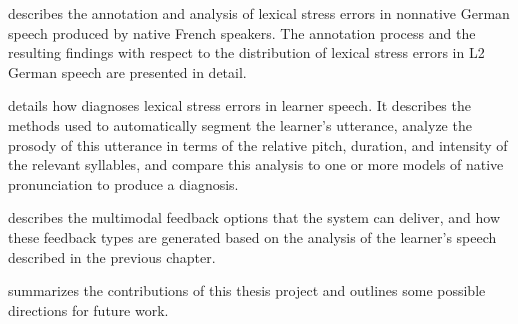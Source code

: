 describes 
the annotation and analysis of lexical stress errors in 
nonnative German speech produced by native French speakers. 
 The annotation process and the resulting findings with respect to the distribution of lexical stress errors in L2 German speech are presented in detail.

 details how  diagnoses lexical stress errors in learner speech. It describes the methods used to automatically segment the learner's utterance, analyze the prosody of this utterance in terms of the relative pitch, duration, and intensity of the relevant syllables, and compare this analysis to one or more models of native pronunciation to produce a diagnosis.

 describes the multimodal feedback options that the system can deliver, and how these feedback types are generated based on the analysis of the learner's speech described in the previous chapter. 


 summarizes the contributions of this thesis project and outlines some 
possible directions for future work.




%

